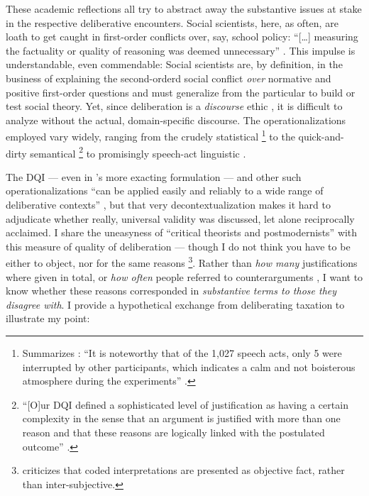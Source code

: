 These academic reflections all try to abstract away the substantive issues at stake in the respective deliberative encounters. 
Social scientists, here, as often, are loath to get caught in first-order conflicts over, say, school policy: ``[\ldots] measuring the factuality or quality of reasoning was deemed unnecessary'' \cite[10]{Stromer-Galley2007}.
This impulse is understandable, even commendable: Social scientists are, by definition, in the business of explaining the second-orderd social conflict \emph{over} normative and positive first-order questions \citep[12][compare]{GutmannThompson-2004-aa} and must generalize from the particular to build or test social theory.
Yet, since deliberation is a \emph{discourse} ethic \citep[153]{GutmannThompson-2002-aa}, it is difficult to analyze without the actual, domain-specific discourse.
The operationalizations employed vary widely, ranging from the crudely statistical \citep{Steiner2012} 
\footnote{
	Summarizes \citeauthor{Steiner2012}: 
	``It is noteworthy that of the 1,027 speech acts, only 5 were interrupted by other participants, which indicates a calm and not boisterous atmosphere during the experiments'' \citeyearpar[47]{Steiner2012}.
	}
to the quick-and-dirty semantical \citep{Steiner2012}
\footnote{
	``[O]ur \gls{DQI} defined a sophisticated level of justification as having a certain complexity in the sense that an argument is justified with more than one reason and that these reasons are logically linked with the postulated outcome'' \cite[64]{Steiner2012}.
}
to promisingly speech-act linguistic \citep{Landwehr2010}.

The \gls{DQI} --- even in \citeauthor{Steenbergen2003}'s more exacting formulation --- and other such operationalizations ``can be applied easily and reliably to a wide range of deliberative contexts'' \citep[22]{Steenbergen2003}, but that very decontextualization makes it hard to adjudicate whether really, universal validity was discussed, let alone reciprocally acclaimed. 
I share the uneasyness of ``critical theorists and postmodernists'' \cite[11]{Steiner2012} with this measure of quality of deliberation --- though I do not think you have to be either to object, nor for the same reasons 
\footnote{
	\cite{King2009} criticizes that coded interpretations are presented as objective fact, rather than inter-subjective.
}.
Rather than \emph{how many} justifications where given in total, or \emph{how often} people referred to counterarguments \cite[29]{Steenbergen2003}, I want to know whether these reasons corresponded in \emph{substantive terms to those they disagree with}.
I provide a hypothetical exchange from deliberating taxation to illustrate my point:

